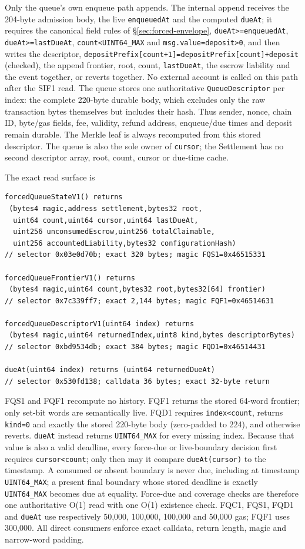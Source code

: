 \documentclass[a4paper,11pt]{article}
\newcommand{\code}[1]{\nolinkurl{#1}}
\begin{document}
Only the queue's own enqueue path appends.  The internal append receives the
204-byte admission body, the live \code{enqueuedAt} and the computed
\code{dueAt}; it requires the canonical field rules of
\S\ref{sec:forced-envelope}, \code{dueAt>=enqueuedAt},
\code{dueAt>=lastDueAt}, \code{count<UINT64_MAX} and
\code{msg.value=deposit>0}, and then writes the descriptor,
\code{depositPrefix[count+1]=depositPrefix[count]+deposit} (checked), the
append frontier, root, count, \code{lastDueAt}, the escrow liability and the
event together, or reverts together.  No external account is called on this
path after the SIF1 read.  The queue stores one authoritative
\code{QueueDescriptor} per index: the complete 220-byte durable body, which
excludes only the raw transaction bytes themselves but includes their hash.
Thus sender, nonce, chain ID, byte/gas fields, fee, validity, refund
address, enqueue/due times and deposit remain durable.  The Merkle leaf is
always recomputed from this stored descriptor.  The queue is also the sole
owner of \code{cursor}; the Settlement has no second descriptor array, root,
count, cursor or due-time cache.

The exact read surface is
\begin{verbatim}
forcedQueueStateV1() returns
 (bytes4 magic,address settlement,bytes32 root,
  uint64 count,uint64 cursor,uint64 lastDueAt,
  uint256 unconsumedEscrow,uint256 totalClaimable,
  uint256 accountedLiability,bytes32 configurationHash)
// selector 0x03e0d70b; exact 320 bytes; magic FQS1=0x46515331

forcedQueueFrontierV1() returns
 (bytes4 magic,uint64 count,bytes32 root,bytes32[64] frontier)
// selector 0x7c339ff7; exact 2,144 bytes; magic FQF1=0x46514631

forcedQueueDescriptorV1(uint64 index) returns
 (bytes4 magic,uint64 returnedIndex,uint8 kind,bytes descriptorBytes)
// selector 0xbd9534db; exact 384 bytes; magic FQD1=0x46514431

dueAt(uint64 index) returns (uint64 returnedDueAt)
// selector 0x530fd138; calldata 36 bytes; exact 32-byte return
\end{verbatim}
FQS1 and FQF1 recompute no history.  FQF1 returns the stored 64-word
frontier; only set-bit words are semantically live.  FQD1 requires
\code{index<count}, returns \code{kind=0} and exactly the stored 220-byte
body (zero-padded to 224), and otherwise reverts.  \code{dueAt} instead
returns \code{UINT64_MAX} for every missing index.  Because that value is
also a valid deadline, every force-due or live-boundary decision first
requires \code{cursor<count}; only then may it compare \code{dueAt(cursor)}
to the timestamp.  A consumed or absent boundary is never due, including at
timestamp \code{UINT64_MAX}; a present final boundary whose stored deadline
is exactly \code{UINT64_MAX} becomes due at equality.  Force-due and
coverage checks are therefore one authoritative O(1) read with one O(1)
existence check.  FQC1, FQS1, FQD1 and \code{dueAt} use respectively 50,000,
100,000, 100,000 and 50,000 gas; FQF1 uses 300,000.  All direct consumers
enforce exact calldata, return length, magic and narrow-word padding.
\end{document}
